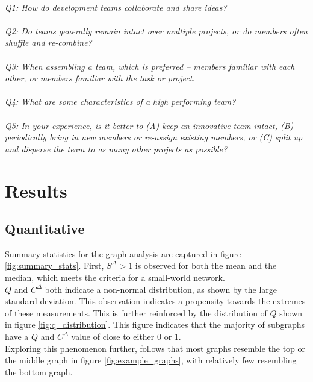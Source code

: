 \documentclass{proc}
\begin{document}
\noindent\\\textit{Q1: How do development teams collaborate and share ideas?}\\
\noindent\\\textit{Q2: Do teams generally remain intact over multiple projects, or do members often shuffle and re-combine?}\\
\noindent\\\textit{Q3: When assembling a team, which is preferred -- members familiar with each other, or members familiar with the task or project.}\\
\noindent\\\textit{Q4: What are some characteristics of a high performing team?}\\
\noindent\\\textit{Q5: In your experience, is it better to (A) keep an innovative team intact, (B) periodically bring in new members or re-assign existing members, or (C) split up and disperse the team to as many other projects as possible?}\\
 

\section{Results}

\subsection{Quantitative}



Summary statistics for the graph analysis are captured in figure \ref{fig:summary_stats}. First, $S^\Delta > 1$ is observed for both the mean and the median, which meets the criteria for a small-world network\cite{humphries2008network}.\\

$Q$ and $C^\Delta$ both indicate a non-normal distribution, as shown by the large standard deviation. This observation indicates a propensity towards the extremes of these measurements. This is further reinforced by the distribution of $Q$ shown in figure \ref{fig:q_distribution}. This figure indicates that the majority of subgraphs have a $Q$ and $C^\Delta$ value of close to either 0 or 1.\\

Exploring this phenomenon further, follows that most graphs resemble the top or the middle graph in figure \ref{fig:example_graphs}, with relatively few resembling the bottom graph.
\end{document}
